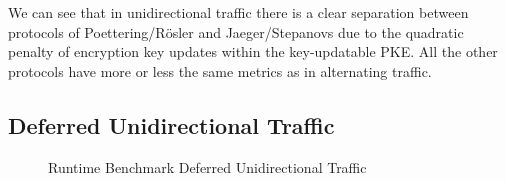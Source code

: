 \documentclass[11pt,a4paper,twoside,openright,bibliography=totoc]{scrbook}
\begin{document}
We can see that in unidirectional traffic there is a clear separation
between protocols of Poettering/Rösler and Jaeger/Stepanovs due
to the quadratic penalty of encryption key updates within the
key-updatable PKE. All the other protocols have more or less
the same metrics as in alternating traffic.

\clearpage

\subsection{Deferred Unidirectional Traffic}
\label{sec:deferr-unid-traff-1}

\begin{figure}[H]
  \centering
   
  \caption{Runtime Benchmark Deferred Unidirectional Traffic}
  \label{fig:time-def-uni}
\end{figure}
\end{document}

